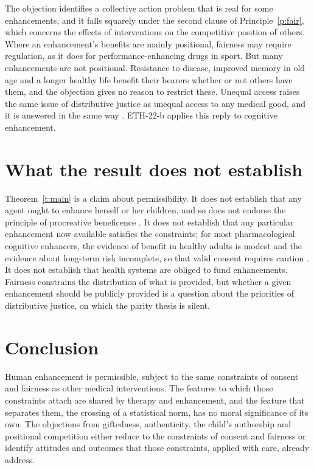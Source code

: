 \documentclass{situationist-preprint}
\begin{document}
\begin{reply}
The objection identifies a collective action problem that is real for some enhancements, and it falls squarely under the second clause of Principle~\ref{p:fair}, which concerns the effects of interventions on the competitive position of others. Where an enhancement's benefits are mainly positional, fairness may require regulation, as it does for performance-enhancing drugs in sport. But many enhancements are not positional. Resistance to disease, improved memory in old age and a longer healthy life benefit their bearers whether or not others have them, and the objection gives no reason to restrict these. Unequal access raises the same issue of distributive justice as unequal access to any medical good, and it is answered in the same way \citep{Buchanan2000}. ETH-22-b applies this reply to cognitive enhancement.
\end{reply}

\section{What the result does not establish}

Theorem~\ref{t:main} is a claim about permissibility. It does not establish that any agent ought to enhance herself or her children, and so does not endorse the principle of procreative beneficence \citep{Savulescu2001}. It does not establish that any particular enhancement now available satisfies the constraints; for most pharmacological cognitive enhancers, the evidence of benefit in healthy adults is modest and the evidence about long-term risk incomplete, so that valid consent requires caution \citep{Greely2008}. It does not establish that health systems are obliged to fund enhancements. Fairness constrains the distribution of what is provided, but whether a given enhancement should be publicly provided is a question about the priorities of distributive justice, on which the parity thesis is silent.

\section{Conclusion}

Human enhancement is permissible, subject to the same constraints of consent and fairness as other medical interventions. The features to which those constraints attach are shared by therapy and enhancement, and the feature that separates them, the crossing of a statistical norm, has no moral significance of its own. The objections from giftedness, authenticity, the child's authorship and positional competition either reduce to the constraints of consent and fairness or identify attitudes and outcomes that those constraints, applied with care, already address.
\end{document}
